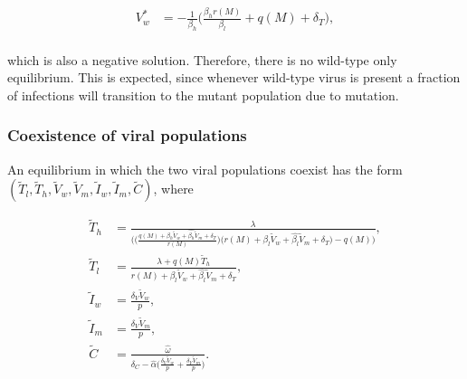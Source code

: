 \documentclass[11pt, oneside]{article}    %
\begin{document}
\begin{align*}
 V_w^* & =  -\frac{1}{\beta_h}\Big( \frac{\beta_h r(M)}{\beta_l} + q(M) + \delta_T \Big),     \\
\end{align*}

which is also a negative solution. Therefore, there is no wild-type only equilibrium. This is expected, since whenever wild-type virus is present a fraction of infections will transition to the mutant population due to mutation. 

\subsubsection{Coexistence of viral populations}

An equilibrium in which the two viral populations coexist has the form $(\tilde{T}_l,\tilde{T}_h,\tilde{V}_w,\tilde{V}_m,\tilde{I}_w,\tilde{I}_m,\tilde{C})$, where

\begin{align*}
\tilde{T}_h & = \frac{\lambda}{\Bigg( \Big( \frac{q(M) + \beta_h \tilde{V}_w + \hat{\beta_h} \tilde{V}_m + \delta_T}{r(M)}  \Big)  \Big(r(M) + \beta_l \tilde{V}_w + \hat{\beta_l} \tilde{V}_m + \delta_T \Big) - q(M) \Bigg)}, \\
\tilde{T}_l & = \frac{\lambda + q(M) \tilde{T}_h}{r(M) + \beta_l \tilde{V}_w + \hat{\beta_l} \tilde{V}_m +\delta_T},\\
\tilde{I}_w & = \frac{\delta_V \tilde{V}_w}{p}, \\
\tilde{I}_m & = \frac{\delta_V \tilde{V}_m}{p}, \\
\tilde{C} & = \frac{ \hat{\omega}}{\delta_C - \hat{\alpha} \big(\frac{\delta_V \tilde{V}_w}{p} + \frac{\delta_V \tilde{V}_m}{p}\big)}. \\ 
\end{align*}
\end{document}
